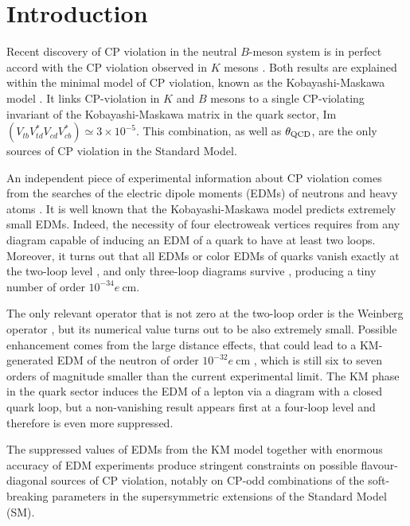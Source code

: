 \vspace{4cm}

\hfill\eject


\section{Introduction}

Recent discovery of CP violation in the neutral $B$-meson system
\cite{Babar,Belle} is in perfect accord with the CP violation
observed in $K$ mesons \cite{1964}. Both results are explained
within the minimal model of CP violation, known as the
Kobayashi-Maskawa model \cite{KM}. It links CP-violation in $K$
and $B$ mesons to a single CP-violating invariant of the
Kobayashi-Maskawa matrix in the quark sector,
Im$(V_{tb}V^*_{td}V_{cd}V^*_{cb}) \simeq 3 \times 10^{-5}$. This
combination, as well as $\theta_{\rm QCD}$, are the only sources
of CP violation in the Standard Model.

An independent piece of experimental information about CP
violation comes from the searches of the electric dipole moments
(EDMs) of neutrons \cite{n} and heavy atoms \cite{Tl,Hg}. It is
well known that the Kobayashi-Maskawa model predicts extremely small
EDMs. Indeed, the necessity of four electroweak vertices requires
from any diagram capable of inducing an EDM of a quark to have at
least two loops. Moreover, it turns out that all EDMs or color
EDMs of quarks vanish exactly at the two-loop level \cite{Shab},
and only three-loop diagrams survive \cite{Kh,CK}, producing a
tiny number of order $10^{-34}e~$cm.

The only relevant operator that is not zero at the two-loop order
is the Weinberg operator \cite{W-P}, but its numerical value turns
out to be also extremely small. Possible enhancement comes from
the large distance effects, that could lead to a KM-generated EDM
of the neutron of order $10^{-32}e~$cm \cite{LD}, which is still
six to seven orders of magnitude smaller than the current
experimental limit. The KM phase in the quark sector induces the
EDM of a lepton via a diagram with a closed quark loop, but a
non-vanishing result appears first at a four-loop level \cite{KP}
and therefore is even more suppressed.

The suppressed values of EDMs from the KM model together with
enormous accuracy of EDM experiments produce stringent constraints
on possible  flavour-diagonal sources of CP violation, notably on
CP-odd combinations of the soft-breaking parameters in the
supersymmetric extensions of the Standard Model (SM).

